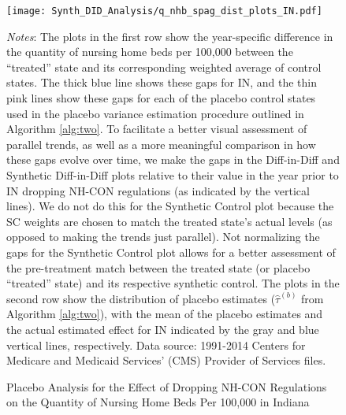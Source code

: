 \documentclass[../Main.tex]{subfiles}
\begin{document}
\newpage
\begin{figure}[t]
	\begin{center}
	\caption{\label{fig: q_nhb_spag_plots_in} \centering Placebo Analysis for the Effect of Dropping NH-CON Regulations on the Quantity of Nursing Home Beds Per 100,000 in Indiana}
    \texttt{[image: Synth\_DID\_Analysis/q\_nhb\_spag\_dist\_plots\_IN.pdf]}
    \end{center}
    \footnotesize
		\textit{Notes}: The plots in the first row show the year-specific difference in the quantity of nursing home beds per 100,000 between the ``treated'' state and its corresponding weighted average of control states. The thick blue line shows these gaps for IN, and the thin pink lines show these gaps for each of the placebo control states used in the placebo variance estimation procedure outlined in Algorithm \ref{alg:two}. To facilitate a better visual assessment of parallel trends, as well as a more meaningful comparison in how these gaps evolve over time, we make the gaps in the Diff-in-Diff and Synthetic Diff-in-Diff plots relative to their value in the year prior to IN dropping NH-CON regulations (as indicated by the vertical lines). We do not do this for the Synthetic Control plot because the SC weights are chosen to match the treated state's actual levels (as opposed to making the trends just parallel). Not normalizing the gaps for the Synthetic Control plot allows for a better assessment of the pre-treatment match between the treated state (or placebo ``treated'' state) and its respective synthetic control. The plots in the second row show the distribution of placebo estimates ($\hat{\tau}^{(b)}$ from Algorithm \ref{alg:two}), with the mean of the placebo estimates and the actual estimated effect for IN indicated by the gray and blue vertical lines, respectively. Data source: 1991-2014 Centers for Medicare and Medicaid Services’ (CMS) Provider of Services files.
\end{figure}
\clearpage
\end{document}
